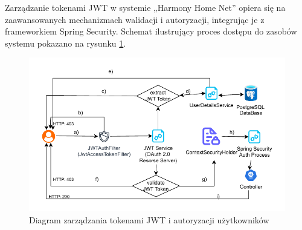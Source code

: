 Zarządzanie tokenami JWT w systemie „Harmony Home Net” opiera się na zaawansowanych mechanizmach walidacji i autoryzacji, integrując je z frameworkiem Spring Security. Schemat ilustrujący proces dostępu do zasobów systemu pokazano na rysunku \ref{fig:resource_access_flow}.
\begin{figure}[ht]
    \centering
    \includegraphics[width=.9\linewidth]{rys03/Diagram_dotępu_do_zasobów_systemu}  %
    \caption{Diagram zarządzania tokenami JWT i autoryzacji użytkowników~\cite{JWToauth}}
    \label{fig:resource_access_flow}
\end{figure}

